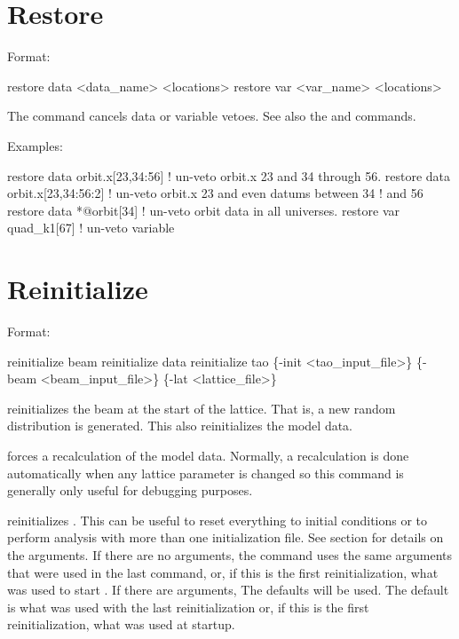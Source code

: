 \section{Restore}
\label{s:restore}

Format:
\begin{example}
  restore data  <data_name> <locations>
  restore var <var_name> <locations>
\end{example}

\vskip 0.2in 
The  command cancels data or variable
vetoes. See also the 
and  commands.

Examples:
\begin{example}
  restore data orbit.x[23,34:56]   ! un-veto orbit.x 23 and 34 through 56.
  restore data orbit.x[23,34:56:2] ! un-veto orbit.x 23 and even datums between 34 
                                   !                                          and 56
  restore data *@orbit[34]         ! un-veto orbit data in all universes.
  restore var quad_k1[67]          ! un-veto variable
\end{example}

\section{Reinitialize}
\label{s:reinit}

Format:
\begin{example}
  reinitialize beam
  reinitialize data
  reinitialize tao \{-init <tao_input_file>\} 
                       \{-beam <beam_input_file>\} \{-lat <lattice_file>\}
\end{example}

\vskip 0.2in 
 reinitializes the beam at the start of the
lattice.  That is, a new random distribution is generated. This also
reinitializes the model data.

 forces a recalculation of the model data.
Normally, a recalculation is done automatically when any lattice
parameter is changed so this command is generally only useful for
debugging purposes.

 reinitializes \tao. This can be useful to reset
everything to initial conditions or to perform analysis with more than
one initialization file.  See section  for
details on the arguments.  If there are no arguments, the
 command uses the same arguments that were used in
the last  command, or, if this is the first
reinitialization, what was used to start \tao. If there are arguments,
The defaults will be used.  The default  is what was
used with the last reinitialization or, if this is the first
reinitialization, what was used at startup.

